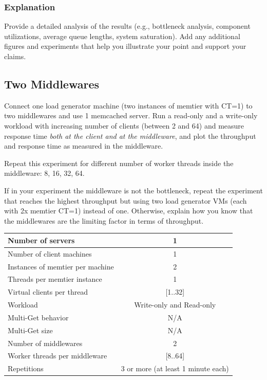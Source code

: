 \documentclass[11pt,a4paper]{article}
\begin{document}
\subsubsection{Explanation}

Provide a detailed analysis of the results (e.g., bottleneck analysis, component utilizations, average queue lengths, system saturation). Add any additional figures and experiments that help you illustrate your point and support your claims.

\subsection{Two Middlewares}

Connect one load generator machine (two instances of memtier with CT=1) to two middlewares and use 1 memcached server. Run a read-only and a write-only workload with increasing number of clients (between 2 and 64) and measure response time \emph{both at the client and at the middleware}, and plot the throughput and response time as measured in the middleware.

Repeat this experiment for different number of worker threads inside the middleware: 8, 16, 32, 64.

If in your experiment the middleware is not the bottleneck, repeat the experiment that reaches the highest throughput but using two load generator VMs (each with 2x memtier CT=1) instead of one. Otherwise, explain how you know that the middlewares are the limiting factor in terms of throughput.

\begin{center}
	\scriptsize{
		\begin{tabular}{|l|c|}
			\hline Number of servers                & 1                        \\
			\hline Number of client machines        & 1                        \\
			\hline Instances of memtier per machine & 2                        \\
			\hline Threads per memtier instance     & 1                        \\
			\hline Virtual clients per thread       & [1..32]                  \\
			\hline Workload                         & Write-only and Read-only \\
			\hline Multi-Get behavior               & N/A                      \\
			\hline Multi-Get size                   & N/A                      \\
			\hline Number of middlewares            & 2                        \\
			\hline Worker threads per middleware    & [8..64]                  \\
			\hline Repetitions                      & 3 or more (at least 1 minute each)                \\
			\hline
		\end{tabular}
	}
\end{center}
\end{document}

